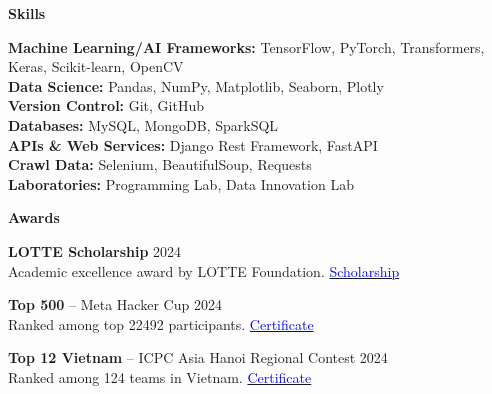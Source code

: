 \documentclass[10pt]{article}
\begin{document}
\begin{center}
    \vspace{0.05cm}
    \hrulefill
    \vspace{0.05cm}
\end{center}

\begin{center}
    \textbf{Skills}
\end{center}

\textbf{Machine Learning/AI Frameworks:} TensorFlow, PyTorch, Transformers, Keras, Scikit-learn, OpenCV \\
\textbf{Data Science:} Pandas, NumPy, Matplotlib, Seaborn, Plotly \\
\textbf{Version Control:} Git, GitHub \\
\textbf{Databases:} MySQL, MongoDB, SparkSQL \\
\textbf{APIs \& Web Services:} Django Rest Framework, FastAPI \\
\textbf{Crawl Data:} Selenium, BeautifulSoup, Requests \\
\textbf{Laboratories:} Programming Lab, Data Innovation Lab

\begin{center}
    \vspace{0.05cm}
    \hrulefill
    \vspace{0.05cm}
\end{center}

\begin{center}
    \textbf{Awards}
\end{center}

\textbf{LOTTE Scholarship} \hfill 2024 \\
Academic excellence award by LOTTE Foundation. \hfill \href{https://drive.google.com/file/d/1-VoS_M4o_Dtu5mwoOiM1BGahttdvneo4/view?usp=sharing}{\textcolor{blue}{Scholarship}}

\textbf{Top 500} -- Meta Hacker Cup \hfill 2024 \\
Ranked among top 22492 participants. \hfill \href{https://www.facebook.com/codingcompetitions/hacker-cup/2024/certificate/484986933064775?source=facebook}{\textcolor{blue}{Certificate}}

\textbf{Top 12 Vietnam} -- ICPC Asia Hanoi Regional Contest \hfill 2024 \\
Ranked among 124 teams in Vietnam. \hfill \href{https://github.com/taitruong256/Competitive-programming/blob/main/DH-Cong-nghiep-Thanh-pho-Ho-Chi-Minh-certificates-Top12-Viet-Nam.pdf}{\textcolor{blue}{Certificate}}
\end{document}
